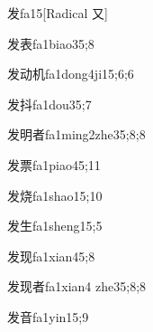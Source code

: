 
\begin{verbete}{发}{fa1}{5}[Radical ⼜]
\end{verbete}

\begin{verbete}{发表}{fa1biao3}{5;8}
\end{verbete}

\begin{verbete}{发动机}{fa1dong4ji1}{5;6;6}
\end{verbete}

\begin{verbete}{发抖}{fa1dou3}{5;7}
\end{verbete}

\begin{verbete}{发明者}{fa1ming2zhe3}{5;8;8}
\end{verbete}

\begin{verbete}{发票}{fa1piao4}{5;11}
\end{verbete}

\begin{verbete}{发烧}{fa1shao1}{5;10}
\end{verbete}

\begin{verbete}{发生}{fa1sheng1}{5;5}
\end{verbete}

\begin{verbete}{发现}{fa1xian4}{5;8}
\end{verbete}

\begin{verbete}{发现者}{fa1xian4 zhe3}{5;8;8}
\end{verbete}

\begin{verbete}{发音}{fa1yin1}{5;9}
\end{verbete}

